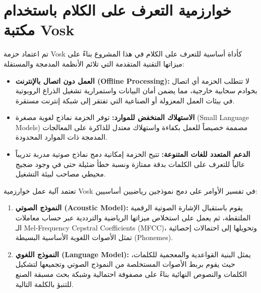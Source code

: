 \section{خوارزمية التعرف على الكلام باستخدام مكتبة Vosk}
تم اعتماد حزمة \textenglish{Vosk} كأداة أساسية للتعرف على الكلام في هذا المشروع بناءً على ميزاتها التقنية المتقدمة التي تلائم الأنظمة المدمجة والمستقلة:

\begin{itemize}
    \item \textbf{العمل دون اتصال بالإنترنت (\textenglish{Offline Processing}):} لا تتطلب الحزمة أي اتصال بخوادم سحابية خارجية، مما يضمن أمان البيانات واستمرارية تشغيل الذراع الروبوتية في بيئات العمل المعزولة أو الصناعية التي تفتقر إلى شبكة إنترنت مستقرة.
    \item \textbf{الاستهلاك المنخفض للموارد:} توفر الحزمة نماذج لغوية مصغرة (\textenglish{Small Language Models}) مصممة خصيصاً للعمل بكفاءة واستهلاك معتدل للذاكرة على المعالجات المدمجة ذات الموارد المحدودة.
    \item \textbf{الدعم المتعدد للغات المتنوعة:} تتيح الحزمة إمكانية دمج نماذج صوتية مدربة تدريباً عالياً للتعرف على الكلمات بدقة ممتازة ونسبة خطأ ضئيلة حتى في وجود ضجيج محيطي مصاحب لبيئة التشغيل.
\end{itemize}

تعتمد آلية عمل خوارزمية \textenglish{Vosk} في تفسير الأوامر على دمج نموذجين رياضيين أساسيين:
\begin{enumerate}
    \item \textbf{النموذج الصوتي (\textenglish{Acoustic Model}):} يقوم باستقبال الإشارة الصوتية الرقمية الملتقطة، ثم يعمل على استخلاص ميزاتها الرياضية والترددية عبر حساب معاملات الـ \textenglish{Mel-Frequency Cepstral Coefficients (MFCC)}، وتحويلها إلى احتمالات إحصائية تمثل الأصوات اللغوية الأساسية البسيطة (\textenglish{Phonemes}).
    \item \textbf{النموذج اللغوي (\textenglish{Language Model}):} يمثل البنية القواعدية والمعجمية للكلمات، حيث يقوم بربط الأصوات المستخلصة من النموذج الصوتي وتجميعها لتشكيل الكلمات والنصوص النهائية بناءً على مصفوفة احتمالية وشبكة بحث مسبقة الصنع للتنبؤ بالكلمة التالية.
\end{enumerate}